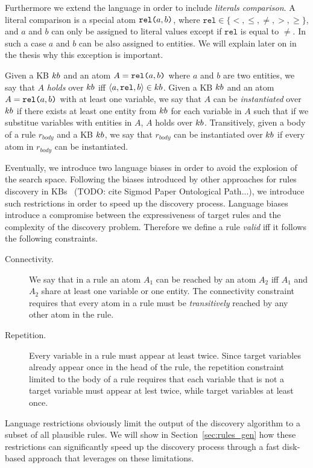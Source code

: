 Furthermore we extend the language in order to include \emph{literals comparison}. A literal comparison is a special atom $\texttt{rel(}a,b\texttt{)}$, where $\texttt{rel} \in \{<,\leq,\neq,>,\geq\}$, and $a$ and $b$ can only be assigned to literal values except if $\texttt{rel}$ is equal to $\neq$. In such a case $a$ and $b$ can be also assigned to entities. We will explain later on in the thesis why this exception is important.

Given a KB ${\sc kb}$ and an atom $A=\texttt{rel(}a,b\texttt{)}$ where $a$ and $b$ are two entities, we say that $A$ \emph{holds} over ${\sc kb}$ iff $\langle a,\texttt{rel},b\rangle \in {\sc kb}$.
Given a KB ${\sc kb}$ and an atom $A=\texttt{rel(}a,b\texttt{)}$ with at least one variable, we say that $A$ can be \emph{instantiated} over ${\sc kb}$ if there exists at least one entity from ${\sc kb}$ for each variable in $A$ such that if we substitue variables with entities in $A$, $A$ holds over ${\sc kb}$. Transitively, given a body of a rule $r_{body}$ and a KB ${\sc kb}$, we say that $r_{body}$ can be instantiated over ${\sc kb}$ if every atom in $r_{body}$ can be instantiated. 

Eventually, we introduce two language biases in order to avoid the explosion of the search space. 
Following the biases introduced by other approaches for rules discovery in KBs~\cite{galarraga2015fast} (TODO: cite Sigmod Paper Ontological Path...), we introduce such restrictions in order to speed up the discovery process. Language biases introduce a compromise between the expressiveness of target rules and the complexity of the discovery problem. Therefore we define a rule \emph{valid} iff it follows the following constraints.
\begin{description}
	\item[Connectivity.] We say that in a rule an atom $A_1$ can be reached by an atom $A_2$ iff $A_1$ and $A_2$ share at least one variable or one entity. The connectivity constraint requires that every atom in a rule must be \emph{transitively} reached by any other atom in the rule.
	\item[Repetition.] Every variable in a rule must appear at least twice. Since target variables already appear once in the head of the rule, the repetition constraint limited to the body of a rule requires that each variable that is not a target variable must appear at lest twice, while target variables at least once.
\end{description}
Language restrictions obviously limit the output of the discovery algorithm to a subset of all plausible rules. We will show in Section~\ref{sec:rules_gen} how these restrictions can significantly speed up the discovery process through a fast disk-based approach that leverages on these limitations.

